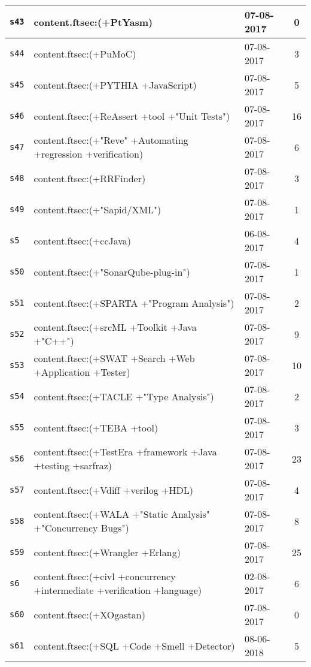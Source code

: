 \begin{longtable}{| l | p{13cm} | l | c |}
    \hline
\texttt{s43} & content.ftsec:(+PtYasm) & 07-08-2017 & 0 \\
    \hline
\texttt{s44} & content.ftsec:(+PuMoC) & 07-08-2017 & 3 \\
    \hline
\texttt{s45} & content.ftsec:(+PYTHIA +JavaScript) & 07-08-2017 & 5 \\
    \hline
\texttt{s46} & content.ftsec:(+ReAssert +tool +"Unit Tests") & 07-08-2017 & 16 \\
    \hline
\texttt{s47} & content.ftsec:(+"Reve" +Automating +regression +verification) & 07-08-2017 & 6 \\
    \hline
\texttt{s48} & content.ftsec:(+RRFinder) & 07-08-2017 & 3 \\
    \hline
\texttt{s49} & content.ftsec:(+"Sapid/XML") & 07-08-2017 & 1 \\
    \hline
\texttt{s5} & content.ftsec:(+ccJava) & 06-08-2017 & 4 \\
    \hline
\texttt{s50} & content.ftsec:(+"SonarQube-plug-in") & 07-08-2017 & 1 \\
    \hline
\texttt{s51} & content.ftsec:(+SPARTA +"Program Analysis") & 07-08-2017 & 2 \\
    \hline
\texttt{s52} & content.ftsec:(+srcML +Toolkit +Java +"C++") & 07-08-2017 & 9 \\
    \hline
\texttt{s53} & content.ftsec:(+SWAT +Search +Web +Application +Tester) & 07-08-2017 & 10 \\
    \hline
\texttt{s54} & content.ftsec:(+TACLE +"Type Analysis") & 07-08-2017 & 2 \\
    \hline
\texttt{s55} & content.ftsec:(+TEBA +tool) & 07-08-2017 & 3 \\
    \hline
\texttt{s56} & content.ftsec:(+TestEra +framework +Java +testing +sarfraz) & 07-08-2017 & 23 \\
    \hline
\texttt{s57} & content.ftsec:(+Vdiff +verilog +HDL) & 07-08-2017 & 4 \\
    \hline
\texttt{s58} & content.ftsec:(+WALA +"Static Analysis" +"Concurrency Bugs") & 07-08-2017 & 8 \\
    \hline
\texttt{s59} & content.ftsec:(+Wrangler +Erlang) & 07-08-2017 & 25 \\
    \hline
\texttt{s6} & content.ftsec:(+civl +concurrency +intermediate +verification +language) & 02-08-2017 & 6 \\
    \hline
\texttt{s60} & content.ftsec:(+XOgastan) & 07-08-2017 & 0 \\
    \hline
\texttt{s61} & content.ftsec:(+SQL +Code +Smell +Detector) & 08-06-2018 & 5 \\

\end{longtable}
